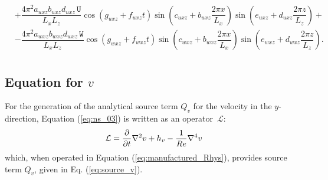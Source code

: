 \documentclass[10pt]{article}
\newcommand{\diff}[2] {\dfrac{\partial #1}{\partial #2}}
\newcommand{\U}{\,\mathtt{U}}
\newcommand{\W}{\,\mathtt{W}}
\newcommand{\Lo}{\,\mathcal{L}}
\begin{document}
\begin{landscape}
\begin{equation*}
\begin{split}
&+ \dfrac{4 \pi^2  a_{uxz} b_{uxz} d_{uxz} \U}{L_x L_z} \cos\left(g_{uxz} + f_{uxz} t\right) \sin\left(c_{uxz} + b_{uxz} \dfrac{2 \pi x}{L_x}\right) \sin\left(e_{uxz} + d_{uxz} \dfrac{2 \pi z}{L_z}\right) +\\
&- \dfrac{4 \pi^2 a_{wxz} b_{wxz} d_{wxz} \W  }{L_x L_z} \cos\left(g_{wxz} + f_{wxz} t\right) \sin\left(c_{wxz} + b_{wxz} \dfrac{2 \pi x}{L_x}\right) \sin\left(e_{wxz} + d_{wxz} \dfrac{2 \pi z}{L_z}\right).\\
 \end{split}
\end{equation*}

\subsection{Equation for $v$}
For the generation of the analytical source term $Q_v$ for the velocity in the $y$-direction, Equation  (\ref{eq:ns_03}) is written as an  operator $\Lo$:
\begin{equation*}
 \Lo=\diff{}{t}\nabla^2 v + h_v - \dfrac{1}{Re} \nabla^4 v\\
\end{equation*}
which, when operated in Equation (\ref{eq:manufactured_Rhys}), provides source term $Q_{v}$, given in Eq. (\ref{eq:source_v}).



\end{landscape}
\end{document}
